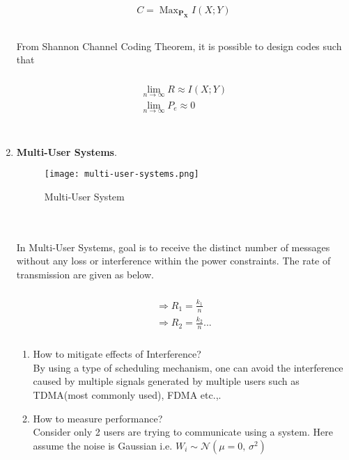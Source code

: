 \documentclass[a4paper]{article}
\DeclareMathOperator*{\maxi}{Max}
\begin{document}
\begin{enumerate}
\\
\begin{align}
\begin{split}
C=\maxi_{\mathbf{P_X}} I(X;Y)\\
\end{split}
\end{align}
\\
From Shannon Channel Coding Theorem, it is possible to design codes such that
\\
\\
\begin{align}
\begin{split}
\lim_{n \to \infty} R \approx I(X;Y)\\
\lim_{n \to \infty} P_e \approx 0\\
\end{split}
\end{align}
\\
\item \textbf{Multi-User Systems}.\\
\begin{figure}[!ht]
\centering
\texttt{[image: multi-user-systems.png]}
\caption{Multi-User System}\label{fig:3}
\end{figure} \\
\\
In Multi-User Systems, goal is to receive the distinct number of messages without any loss or interference within the power constraints. The rate of transmission are given as below.
\\
\\
\begin{align}
\begin{split}
	\Rightarrow R_1 = \frac{k_1}{n}\\
	\Rightarrow R_2 = \frac{k_2}{n}...\\
\end{split}
\end{align}
\begin{enumerate}
\item How to mitigate effects of Interference?\\
By using a type of scheduling mechanism, one can avoid the interference caused by multiple signals generated by multiple users such as TDMA(most commonly used), FDMA etc.,.
\\
\item How to measure performance?\\
Consider only 2 users are trying to communicate using a system. Here assume the noise is Gaussian i.e. $W_i \sim \mathcal{N}(\mu = 0,\,\sigma^{2})$

\end{enumerate}
\end{enumerate}
\end{document}
